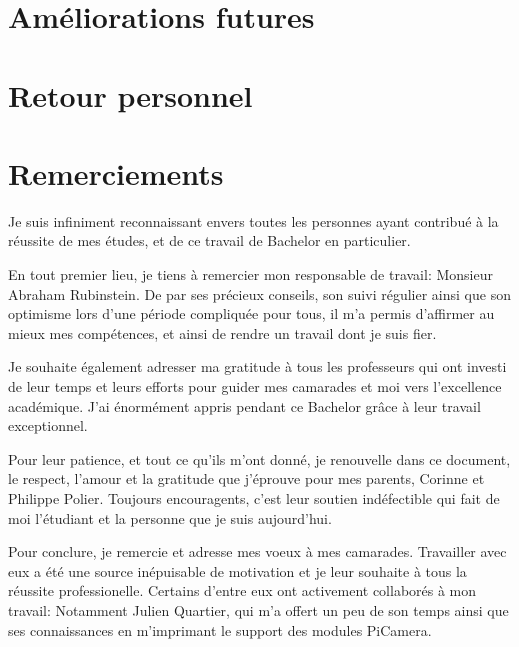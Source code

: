 \section{Améliorations futures}

\section{Retour personnel}

\section{Remerciements}

Je suis infiniment reconnaissant envers toutes les personnes ayant contribué à la réussite de mes
études, et de ce travail de Bachelor en particulier.

En tout premier lieu, je tiens à remercier mon responsable de travail: Monsieur Abraham Rubinstein.
De par ses précieux conseils, son suivi régulier ainsi que son optimisme lors d'une période compliquée pour tous, il m'a permis
d'affirmer au mieux mes compétences, et ainsi de rendre un travail dont je suis fier.

Je souhaite également adresser ma gratitude à tous les professeurs qui ont investi de leur temps et leurs efforts pour
guider mes camarades et moi vers l'excellence académique. J'ai énormément appris pendant ce Bachelor grâce à leur travail exceptionnel.

Pour leur patience, et tout ce qu'ils m'ont donné, je renouvelle dans ce document, le respect, l'amour et la gratitude que j'éprouve pour mes parents, Corinne et Philippe Polier.
Toujours encouragents, c'est leur soutien indéfectible qui fait de moi l'étudiant et la personne que je suis aujourd'hui.

Pour conclure, je remercie et adresse mes voeux à mes camarades. 
Travailler avec eux a été une source inépuisable de motivation et je leur souhaite à tous la réussite professionelle.
Certains d'entre eux ont activement collaborés à mon travail: Notamment Julien Quartier, qui m'a offert un peu de son temps ainsi que ses connaissances
en m'imprimant le support des modules PiCamera.



